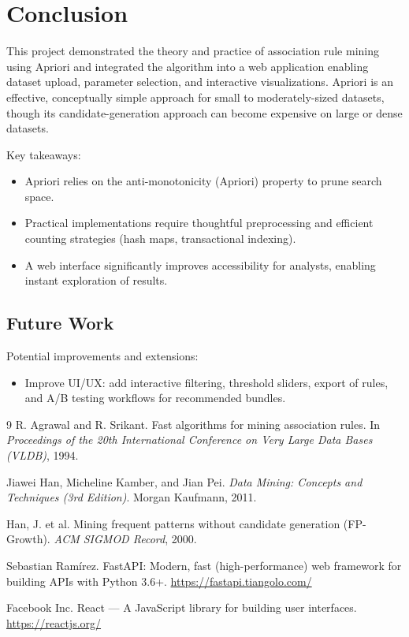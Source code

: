 \documentclass[12pt,a4paper]{report}
\begin{document}
\chapter*{Conclusion}

This project demonstrated the theory and practice of association rule mining using Apriori and integrated the algorithm into a web application enabling dataset upload, parameter selection, and interactive visualizations. Apriori is an effective, conceptually simple approach for small to moderately-sized datasets, though its candidate-generation approach can become expensive on large or dense datasets.

Key takeaways:
\begin{itemize}[nosep]
  \item Apriori relies on the anti-monotonicity (Apriori) property to prune search space.
  \item Practical implementations require thoughtful preprocessing and efficient counting strategies (hash maps, transactional indexing).
  \item A web interface significantly improves accessibility for analysts, enabling instant exploration of results.
\end{itemize}

\section*{Future Work}
Potential improvements and extensions:
\begin{itemize}[nosep]
  \item Improve UI/UX: add interactive filtering, threshold sliders, export of rules, and A/B testing workflows for recommended bundles.
\end{itemize}

\begin{thebibliography}{9}
R. Agrawal and R. Srikant.
\newblock Fast algorithms for mining association rules.
\newblock In \emph{Proceedings of the 20th International Conference on Very Large Data Bases (VLDB)}, 1994.

Jiawei Han, Micheline Kamber, and Jian Pei.
\newblock \emph{Data Mining: Concepts and Techniques (3rd Edition)}.
\newblock Morgan Kaufmann, 2011.

Han, J. et al.
\newblock Mining frequent patterns without candidate generation (FP-Growth).
\newblock \emph{ACM SIGMOD Record}, 2000.

Sebastian Ram\'irez.
\newblock FastAPI: Modern, fast (high-performance) web framework for building APIs with Python 3.6+.
\newblock \url{https://fastapi.tiangolo.com/}

Facebook Inc.
\newblock React — A JavaScript library for building user interfaces.
\newblock \url{https://reactjs.org/}
\end{thebibliography}

\end{document}
